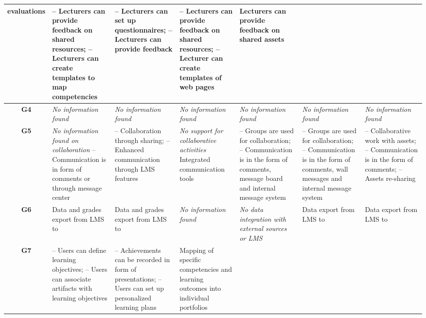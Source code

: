 \begin{sidewaystable}
\begin{tabular}{|c|p{3.25cm}|p{3.25cm}|p{3.25cm}|p{3.25cm}|p{3.25cm}|p{3.25cm}|}
	evaluations & 
	-- Lecturers can provide feedback on shared resources; \newline -- Lecturers
	can create templates to map competencies & 
	-- Lecturers can set up questionnaires; \newline -- Lecturers can provide
	feedback & 
	-- Lecturers can provide feedback on shared resources; \newline -- Lecturer
	can create templates of web pages & 
	Lecturers can provide feedback on shared assets	\\	\hline 
	\textbf{G4} & \textit{No information found} & \textit{No information found} &
	\textit{No information found} & \textit{No information found} & 
	\textit{No information found} & \textit{No information found} \\ \hline 
	\textbf{G5} & 
	\textit{No information found on collaboration} \newline -- Communication is
	in form of comments or through message center & 
	-- Collaboration through sharing; \newline -- Enhanced communication through
	LMS features & 
	\textit {No support for collaborative activities} \newline Integrated
	communication tools & 
	-- Groups are used for collaboration; \newline --	Communication is in 
	the form of comments, message board and internal message system & 
	-- Groups are used for collaboration; \newline -- Communication is
	in the form of comments, wall messages and internal message system & 
	-- Collaborative work with assets; \newline -- Communication is
	in the form of comments; \newline -- Assets re-sharing \\
	\hline 
	\textbf{G6} & 
	Data and grades export from LMS to \ep & 
	Data and grades export from LMS to \ep & 
	\textit{No information found} & 
	\textit{No data integration with external sources or LMS} & 
	Data export from LMS to \ep & 
	Data export from LMS to \ep \\ \hline
	\textbf{G7} & 
	-- Users can define learning objectives; \newline -- Users can
	associate artifacts with learning objectives & 
	-- Achievements can be recorded in form of presentations; \newline -- Users can
	set up personalized learning plans & 
	Mapping of specific competencies and learning outcomes into individual
	portfolios & 

\end{tabular}
\end{sidewaystable}
